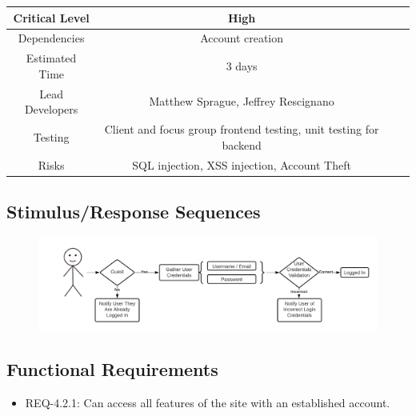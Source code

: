 \documentclass{scrreprt}
\begin{document}
\begin{center}
    \begin{tabular}{| c | c | c | c |}
        \hline
        Critical Level  & High                                                              \\
        \hline
        Dependencies    & Account creation                                                  \\
        \hline
        Estimated Time  & 3 days                                                            \\
        \hline
        Lead Developers & Matthew Sprague, Jeffrey Rescignano                               \\
        \hline
        Testing         & Client and focus group \gls{frontend} testing,
                          \gls{unit testing} for \gls{backend}                              \\
        \hline
        Risks           & \gls{SQL injection}, \gls{XSS injection}, Account Theft           \\
        \hline
    \end{tabular}
\end{center}

\subsection{Stimulus/Response Sequences}

\begin{figure}[H]\centering
    \includegraphics[width=\columnwidth]{FlowCharts/Security-Login.png}
\end{figure}

\subsection{\gls{Functional Requirements}}

\begin{itemize}
    \item REQ-4.2.1: Can access all features of the site with an established account.
\end{itemize}
\end{document}
